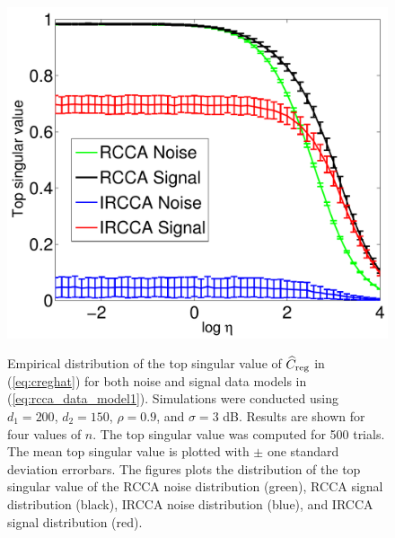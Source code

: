 \begin{figure}[h!]
{\includegraphics[width=\figwidth]{figures/ircca_errorbars_high_snr_n_300.pdf} 
} 
\caption{Empirical distribution of the top singular value of $\widehat{C}_{\text{reg}}$ in
  (\ref{eq:creghat}) for both noise and signal data models in
  (\ref{eq:rcca_data_model1}). Simulations were conducted using $d_1=200$, $d_2=150$,
  $\rho=0.9$, and $\sigma=3$ dB. Results are shown for four values of $n$. The top
  singular value was computed for 500 trials. The mean top singular value is plotted with
  $\pm$ one standard deviation errorbars. The figures plots the distribution of the top
  singular value of the RCCA noise distribution (green), RCCA signal distribution (black),
  IRCCA noise distribution (blue), and IRCCA signal distribution (red).}
\label{fig:rcca_errorbars_high_snr}
\end{figure}

